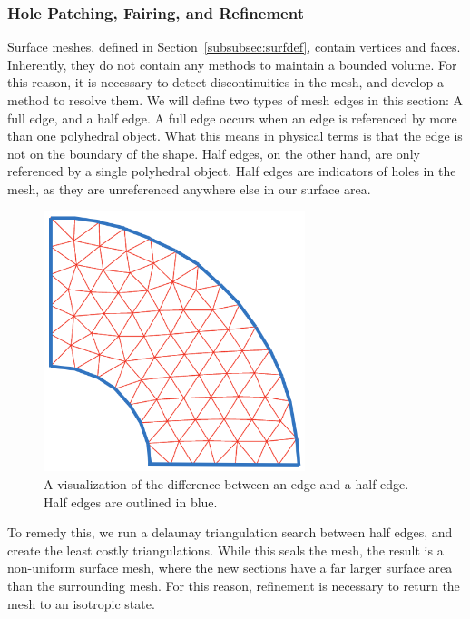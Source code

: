 \documentclass[12pt]{drexelthesis}
\let\Oldsubsubsection\subsubsection
\renewcommand{\subsubsection}{\FloatBarrier\Oldsubsubsection}
\begin{document}
\begin{table}[h]
\begin{tabular}{ | c | c | c | }
\\
\hline
\end{tabular}
\end{table}


 

\subsubsection{Hole Patching, Fairing, and Refinement}

Surface meshes, defined in Section~\ref{subsubsec:surfdef}, contain vertices and faces. Inherently, they do not contain any methods to maintain a bounded volume. For this reason, it is necessary to detect discontinuities in the mesh, and develop a method to resolve them. We will define two types of mesh edges in this section: A full edge, and a half edge.
A full edge occurs when an edge is referenced by more than one polyhedral object. What this means in physical terms is that the edge is not on the boundary of the shape. Half edges, on the other hand, are only referenced by a single polyhedral object. Half edges are indicators of holes in the mesh, as they are unreferenced anywhere else in our surface area.

\begin{figure}[!ht]
	\centering
		\includegraphics[width=3in]{edgevshalfedge.png}
		\caption[Example of an edge vs. a half edge]{\centering A visualization of the difference between an edge and a half edge. Half edges are outlined in blue.}
\end{figure}

To remedy this, we run a delaunay triangulation search between half edges, and create the least costly triangulations. While this seals the mesh, the result is a non-uniform surface mesh, where the new sections have a far larger surface area than the surrounding mesh. For this reason, refinement is necessary to return the mesh to an isotropic state.
\end{document}
